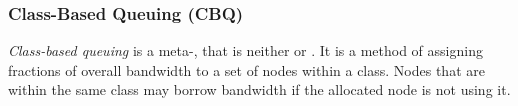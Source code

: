 \subsubsection{Class-Based Queuing (CBQ)}\label{subsubsec:Class_Based_Queuing}
\begin{definition}\label{def:Class_Based_Queuing}
  \emph{Class-based queuing} is a meta-, that is neither  or .
  It is a method of assigning fractions of overall bandwidth to a set of nodes within a class.
  Nodes that are within the same class may borrow bandwidth if the allocated node is not using it.
\end{definition}

